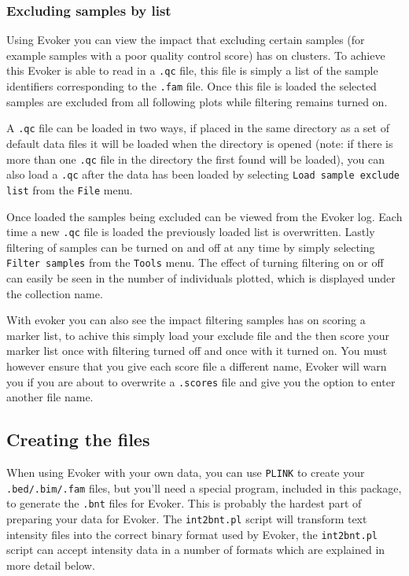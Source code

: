 \documentclass{article}
\begin{document}
\subsubsection{Excluding samples by list}
Using Evoker you can view the impact that excluding certain samples (for example samples with a poor quality control score) has on clusters. To achieve this Evoker is able to read in a \texttt{.qc} file, this file is simply a list of the sample identifiers corresponding to the \texttt{.fam} file. Once this file is loaded the selected samples are excluded from all following plots while filtering remains turned on.

A \texttt{.qc}  file can be loaded in two ways, if placed in the same directory as a set of default data files it will be loaded when the directory is opened  (note: if there is more than one \texttt{.qc} file in the directory the first found will be loaded), you can also load a  \texttt{.qc} after the data has been loaded by selecting \texttt{Load sample exclude list} from the \texttt{File} menu. 

Once loaded the samples being excluded can be viewed from the Evoker log. Each time a new \texttt{.qc} file is loaded the previously loaded list is overwritten. Lastly filtering of samples can be turned on and off at any time by simply selecting \texttt{Filter samples} from the \texttt{Tools} menu. The effect of turning filtering on or off can easily be seen in the number of individuals plotted, which is displayed under the collection name.

With evoker you can also see the impact filtering samples has on scoring a marker list, to achive this simply load your exclude file and the then score your marker list once with filtering turned off and once with it turned on. You must however ensure that you give each score file a different name, Evoker will warn you if you are about to overwrite a \texttt{.scores} file and give you the option to enter another file name.

\subsection{Creating the files}

When using Evoker with your own data, you can use \texttt{PLINK} to create your \texttt{.bed/.bim/.fam} files, but you'll need a special program, included in this package, to generate the \texttt{.bnt} files for Evoker. This is probably the hardest part of preparing your data for Evoker. The \texttt{int2bnt.pl} script will transform text intensity files into the correct binary format used by Evoker, the \texttt{int2bnt.pl} script can accept intensity data in a number of formats which are explained in more detail below.
\end{document}
